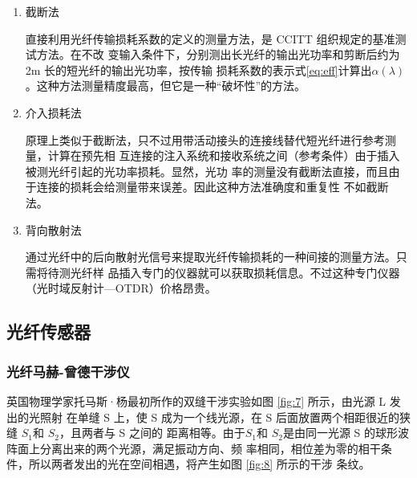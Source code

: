 \documentclass[10pt,a4paper,twoside,UTF8]{ctexart}
\begin{document}
\begin{enumerate}
	\item 截断法
	
	直接利用光纤传输损耗系数的定义的测量方法，是 CCITT 组织规定的基准测试方法。在不改
变输入条件下，分别测出长光纤的输出光功率和剪断后约为 2m 长的短光纤的输出光功率，按传输
损耗系数的表示式\ref{eq:eff}计算出$\alpha(\lambda)$。这种方法测量精度最高，但它是一种“破坏性”的方法。

    \item 介入损耗法
    
	原理上类似于截断法，只不过用带活动接头的连接线替代短光纤进行参考测量，计算在预先相
互连接的注入系统和接收系统之间（参考条件）由于插入被测光纤引起的光功率损耗。显然，光功
率的测量没有截断法直接，而且由于连接的损耗会给测量带来误差。因此这种方法准确度和重复性
不如截断法。

    \item 背向散射法

	通过光纤中的后向散射光信号来提取光纤传输损耗的一种间接的测量方法。只需将待测光纤样
	品插入专门的仪器就可以获取损耗信息。不过这种专门仪器（光时域反射计—OTDR）价格昂贵。
\end{enumerate}


\subsection{光纤传感器}
\subsubsection{光纤马赫-曾德干涉仪}
英国物理学家托马斯·杨最初所作的双缝干涉实验如图 \ref{fig:7} 所示，由光源 L 发出的光照射
在单缝 S 上，使 S 成为一个线光源，在 S 后面放置两个相距很近的狭缝 $S_1$和 $S_2$，且两者与 S 之间的
距离相等。由于$S_1$和 $S_2$是由同一光源 S 的球形波阵面上分离出来的两个光源，满足振动方向、频
率相同，相位差为零的相干条件，所以两者发出的光在空间相遇，将产生如图 \ref{fig:8} 所示的干涉
条纹。

\begin{figure}[H]
	\centering
	\caption{}
\end{figure}
\end{document}
